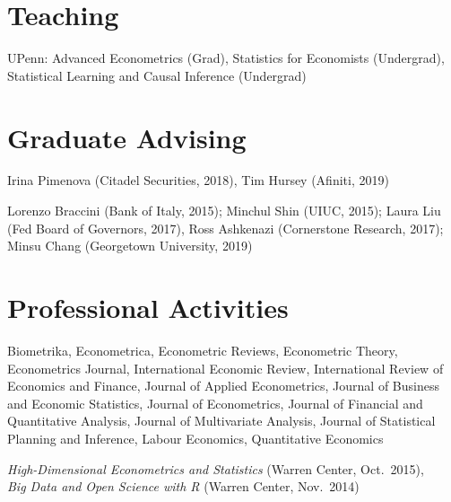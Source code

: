 \documentclass[line,overlapped]{myres}
\begin{document}
\begin{resume}
\section{\sc Teaching }
\vspace{0.5em}
	UPenn: Advanced Econometrics (Grad), Statistics for Economists (Undergrad), Statistical Learning and Causal Inference (Undergrad)
	


\section{\sc Graduate Advising}
\begin{description}[style=multiline,leftmargin=3cm,font=\normalfont]
  \item[Main Supervisor:] Irina Pimenova (Citadel Securities, 2018), Tim Hursey (Afiniti, 2019)
  \item[Committee \\ Member:] Lorenzo Braccini (Bank of Italy, 2015); Minchul Shin (UIUC, 2015); Laura Liu (Fed Board of Governors, 2017), Ross Ashkenazi (Cornerstone Research, 2017); Minsu Chang (Georgetown University, 2019)
\end{description}


\section{\sc Professional Activities}

\begin{description}[style=multiline,leftmargin=3cm,font=\normalfont]
  \item[Refereeing:] Biometrika, Econometrica, Econometric Reviews, Econometric Theory, Econometrics Journal, International Economic Review, International Review of Economics and Finance, Journal of Applied Econometrics, Journal of Business and Economic Statistics, Journal of Econometrics, Journal of Financial and Quantitative Analysis, Journal of Multivariate Analysis, Journal of Statistical Planning and Inference, Labour Economics, Quantitative Economics 
  \item[Workshops \\ Organized:]
    \emph{High-Dimensional Econometrics and Statistics} (Warren Center, Oct.\ 2015), \\
    \emph{Big Data and Open Science with R} (Warren Center, Nov.\ 2014)
\end{description}




\end{resume}
\end{document}
